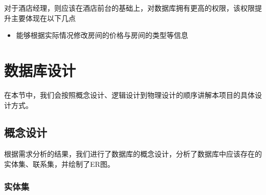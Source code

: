 \documentclass{myreport}
\begin{document}
对于酒店经理，则应该在酒店前台的基础上，对数据库拥有更高的权限，该权限提升主要体现在以下几点

\begin{itemize}
    \item 能够根据实际情况修改房间的价格与房间的类型等信息
\end{itemize}

\chapter{数据库设计}
在本节中，我们会按照概念设计、逻辑设计到物理设计的顺序讲解本项目的具体设计方式。
\section{概念设计}
根据需求分析的结果，我们进行了数据库的概念设计，分析了数据库中应该存在的实体集、联系集，并绘制了ER图。
\subsection{实体集}



\end{document}
